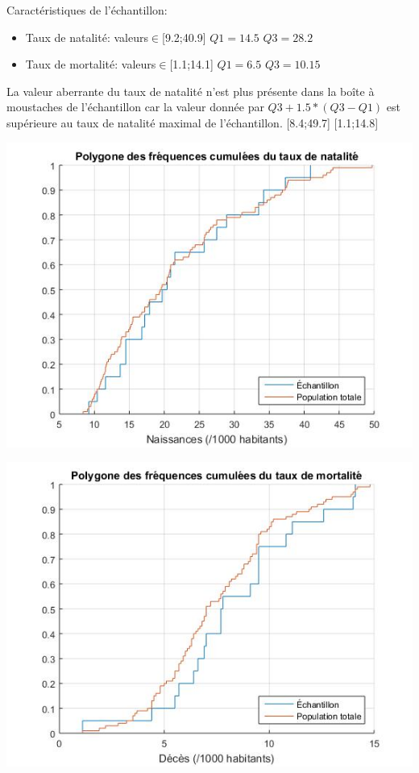 \documentclass[a4paper,10pt]{article}
\begin{document}
Caractéristiques de l'échantillon: 

\begin{itemize}
	\item Taux de natalité: valeurs$\in$[9.2;40.9] $Q1=14.5$ $Q3=28.2$
	\item Taux de mortalité: valeurs$\in$[1.1;14.1] $Q1=6.5$ $Q3=10.15$ 
\end{itemize}

La valeur aberrante du taux de natalité n'est plus présente dans la boîte à moustaches de l'échantillon car la valeur donnée par $Q3+1.5*(Q3-Q1)$ est supérieure au taux de natalité maximal de l'échantillon. [8.4;49.7]  [1.1;14.8]


\begin{center}
	\includegraphics[scale=0.5]{Figure7.jpg}
\end{center}

\begin{center}
	\includegraphics[scale=0.5]{Figure8.jpg}
\end{center}
\end{document}
